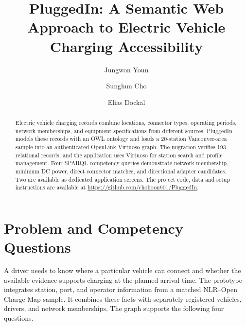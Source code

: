 \documentclass[sigconf,nonacm]{acmart}
\begin{document}
\title{PluggedIn: A Semantic Web Approach to Electric Vehicle Charging Accessibility}

\author{Jungwon Youn}

\author{Sunghun Cho}

\author{Elias Dockal}

\begin{abstract}
Electric vehicle charging records combine locations, connector types, operating periods, network memberships, and equipment specifications from different sources. PluggedIn models these records with an OWL ontology and loads a 20-station Vancouver-area sample into an authenticated OpenLink Virtuoso graph. The migration verifies 193 relational records, and the application uses Virtuoso for station search and profile management. Four SPARQL competency queries demonstrate network membership, minimum DC power, direct connector matches, and directional adapter candidates. Two are available as dedicated application screens. The project code, data and setup instructions are available at \url{https://github.com/chohoon901/PluggedIn}.
\end{abstract}

\maketitle

\section{Problem and Competency Questions}

A driver needs to know where a particular vehicle can connect and whether the available evidence supports charging at the planned arrival time. The prototype integrates station, port, and operator information from a matched NLR--Open Charge Map sample. It combines these facts with separately registered vehicles, drivers, and network memberships. The graph supports the following four questions.
\end{document}
